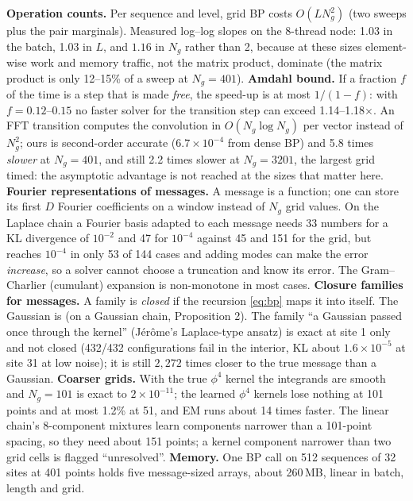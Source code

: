\textbf{Operation counts.} Per sequence and level, grid BP costs $O(LN_g^2)$ (two sweeps plus the pair marginals). Measured log--log slopes on the 8-thread node: 1.03 in the batch, 1.03 in $L$, and $1.16$ in $N_g$ rather than 2, because at these sizes element-wise work and memory traffic, not the matrix product, dominate (the matrix product is only 12--15\% of a sweep at $N_g=401$).
\textbf{Amdahl bound.} If a fraction $f$ of the time is a step that is made \emph{free}, the speed-up is at most $1/(1-f)$: with $f=0.12$--$0.15$ no faster solver for the transition step can exceed 1.14--1.18$\times$. An FFT transition computes the convolution in $O(N_g\log N_g)$ per vector instead of $N_g^2$; ours is second-order accurate ($6.7\times10^{-4}$ from dense BP) and
5.8 times \emph{slower} at $N_g=401$, and still 2.2 times slower at $N_g=3201$, the largest grid timed: the asymptotic advantage is not reached at the sizes that matter here.
\textbf{Fourier representations of messages.} A message is a function; one can store its first $D$ Fourier coefficients on a window instead of $N_g$ grid values. On the Laplace chain a Fourier basis adapted to each message needs 33 numbers for a KL divergence of $10^{-2}$ and 47 for $10^{-4}$ against 45 and 151 for the grid, but reaches $10^{-4}$ in only 53 of 144 cases and adding modes can make the error \emph{increase}, so a solver cannot choose a truncation and know its error. The Gram--Charlier (cumulant) expansion is non-monotone in most cases.
\textbf{Closure families for messages.} A family is \emph{closed} if the recursion \eqref{eq:bp} maps it into itself. The Gaussian is (on a Gaussian chain, Proposition 2). The family ``a Gaussian passed once through the kernel'' (Jérôme's Laplace-type ansatz) is exact at site 1 only and not closed (432/432 configurations fail in the interior, KL about $1.6\times10^{-5}$ at site 31 at low noise); it is still $2{,}272$ times closer to the true message than a Gaussian.
\textbf{Coarser grids.} With the true $\phi^4$ kernel the integrands are smooth and $N_g=101$ is exact to $2\times10^{-11}$; the learned $\phi^4$ kernels lose nothing at 101 points and at most 1.2\% at 51, and EM runs about 14 times faster. The linear chain's 8-component mixtures learn components narrower than a 101-point spacing, so they need about 151 points; a kernel component narrower than two grid cells is flagged ``unresolved''.
\textbf{Memory.} One BP call on 512 sequences of 32 sites at 401 points holds five message-sized arrays, about 260\,MB, linear in batch, length and grid.

